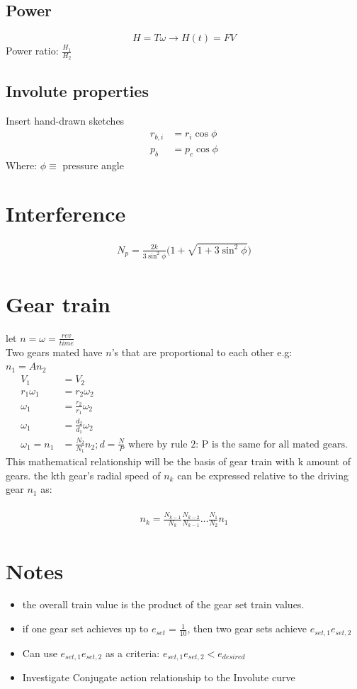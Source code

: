 \documentclass[11pt]{article}
\begin{document}
\subsection{Power}
$$H = T\omega \rightarrow H(t)=FV$$
Power ratio: $\frac{H_1}{H_2}$
\subsection{Involute properties}
Insert hand-drawn sketches
\begin{align*}
    r_{b,i}&=r_i \cos \phi
    \\
    p_b &= p_c \cos \phi
\end{align*}
Where: $\phi \equiv$ pressure angle
\section{Interference}
\begin{align*}
    N_p=\frac{2k}{3 \sin^2 \phi}\bigg( 1 + \sqrt{1 + 3 \sin^2 \phi} \bigg)
\end{align*}
\section{Gear train}
let $n = \omega = \frac{rev}{time}$
\\
Two gears mated have $n$'s that are proportional to each other e.g:
\\
$n_1 = An_2$
\begin{align*}
    V_1&=V_2
    \\
    r_1 \omega_1 &= r_2 \omega_2
    \\
    \omega_1 &= \frac{r_2}{r_1} \omega_2
    \\
    \omega_1 &= \frac{d_2}{d_1} \omega_2
    \\
    \omega_1= n_1 &= \frac{N_2}{N_1} n_2; d = \frac{N}{P} \text{ where by rule 2: P is the same for all mated gears.}  
\end{align*}
This mathematical relationship will be the basis of gear train with k amount of gears. the kth gear's radial speed of $n_k$ can be expressed relative to the driving gear $n_1$ as:
\\~\\
\begin{align*}
    n_k = \frac{N_{k-1}}{N_{k}} \frac{N_{k-2}}{N_{k-1}} \dots \frac{N_1}{N_2}n_1
\end{align*}

\section*{Notes}
\begin{itemize}
    \item the overall train value is the product of the gear set train values.
    \item if one gear set achieves up to $e_{set}=\frac{1}{10}$, then two gear sets achieve $e_{set,1} e_{set,2}$
    \item Can use $e_{set,1} e_{set,2}$ as a criteria: $e_{set,1} e_{set,2} < e_{desired}$
    \item Investigate Conjugate action relationship to the Involute curve
\end{itemize}
\end{document}
